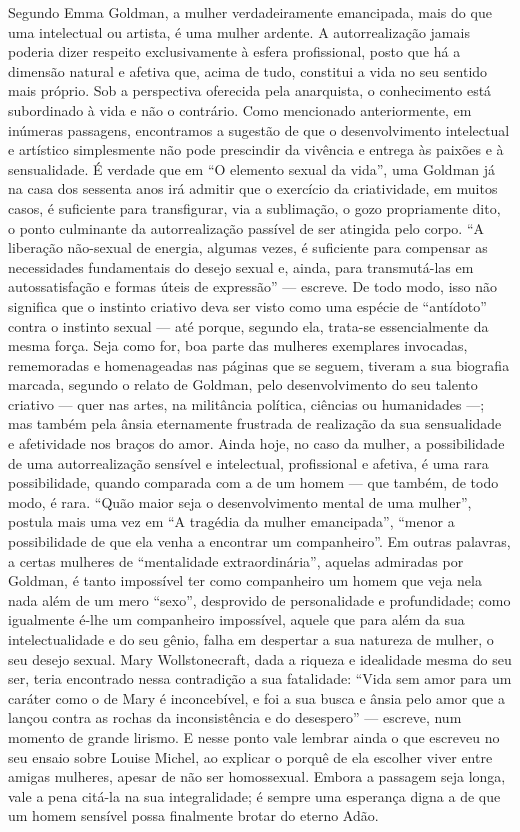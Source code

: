 Segundo Emma Goldman, a mulher verdadeiramente emancipada, mais do que
uma intelectual ou artista, é uma mulher ardente. A autorrealização
jamais poderia dizer respeito exclusivamente à esfera profissional,
posto que há a dimensão natural e afetiva que, acima de tudo, constitui
a vida no seu sentido mais próprio. Sob a perspectiva oferecida pela
anarquista, o conhecimento está subordinado à vida e não o contrário.
Como mencionado anteriormente, em inúmeras passagens, encontramos a
sugestão de que o desenvolvimento intelectual e artístico simplesmente
não pode prescindir da vivência e entrega às paixões e à sensualidade. É
verdade que em ``O elemento sexual da vida'', uma Goldman já na casa dos
sessenta anos irá admitir que o exercício da criatividade, em muitos
casos, é suficiente para transfigurar, via a sublimação, o gozo
propriamente dito, o ponto culminante da autorrealização passível de ser
atingida pelo corpo. ``A liberação não-sexual de energia, algumas vezes,
é suficiente para compensar as necessidades fundamentais do desejo
sexual e, ainda, para transmutá-las em autossatisfação e formas úteis de
expressão'' --- escreve. De todo modo, isso não significa que o instinto
criativo deva ser visto como uma espécie de ``antídoto'' contra o
instinto sexual --- até porque, segundo ela, trata-se essencialmente da
mesma força. Seja como for, boa parte das mulheres exemplares invocadas,
rememoradas e homenageadas nas páginas que se seguem, tiveram a sua
biografia marcada, segundo o relato de Goldman, pelo desenvolvimento do
seu talento criativo --- quer nas artes, na militância política, ciências
ou humanidades ---; mas também pela ânsia eternamente frustrada de
realização da sua sensualidade e afetividade nos braços do amor. Ainda
hoje, no caso da mulher, a possibilidade de uma autorrealização sensível
e intelectual, profissional e afetiva, é uma rara possibilidade, quando
comparada com a de um homem --- que também, de todo modo, é rara. ``Quão
maior seja o desenvolvimento mental de uma mulher'', postula mais uma
vez em ``A tragédia da mulher emancipada'', ``menor a possibilidade de
que ela venha a encontrar um companheiro''. Em outras palavras, a certas
mulheres de ``mentalidade extraordinária'', aquelas admiradas por
Goldman, é tanto impossível ter como companheiro um homem que veja nela
nada além de um mero ``sexo'', desprovido de personalidade e
profundidade; como igualmente é-lhe um companheiro impossível, aquele
que para além da sua intelectualidade e do seu gênio, falha em despertar
a sua natureza de mulher, o seu desejo sexual. Mary Wollstonecraft, dada
a riqueza e idealidade mesma do seu ser, teria encontrado nessa
contradição a sua fatalidade: ``Vida sem amor para um caráter como o de
Mary é inconcebível, e foi a sua busca e ânsia pelo amor que a lançou
contra as rochas da inconsistência e do desespero'' --- escreve, num
momento de grande lirismo. E nesse ponto vale lembrar ainda o que
escreveu no seu ensaio sobre Louise Michel, ao explicar o porquê de ela
escolher viver entre amigas mulheres, apesar de não ser homossexual.
Embora a passagem seja longa, vale a pena citá-la na sua integralidade;
é sempre uma esperança digna a de que um homem sensível possa finalmente
brotar do eterno Adão.

